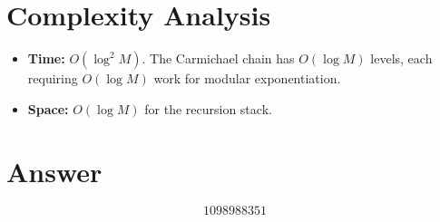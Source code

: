 \documentclass[12pt]{article}
\begin{document}
\section{Complexity Analysis}

\begin{itemize}
\item \textbf{Time:} $O(\log^2 M)$. The Carmichael chain has $O(\log M)$ levels, each requiring $O(\log M)$ work for modular exponentiation.
\item \textbf{Space:} $O(\log M)$ for the recursion stack.
\end{itemize}

\section{Answer}

\[
\boxed{1098988351}
\]
\end{document}
